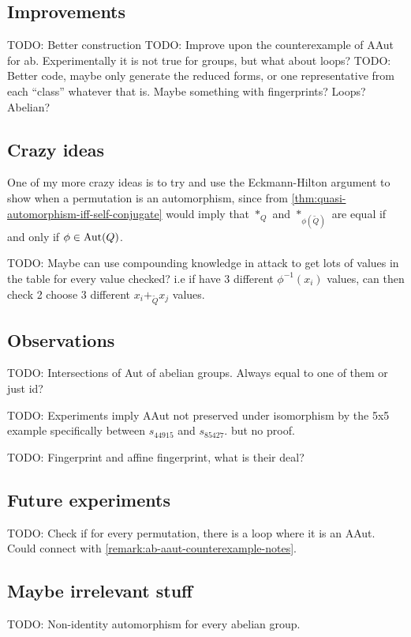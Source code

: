 \subsection{Improvements}

TODO: Better construction 
TODO: Improve upon the counterexample of AAut for ab. Experimentally it is not true for groups, but what about loops?
TODO: Better code, maybe only generate the reduced forms, or one representative from each ``class'' whatever that is. Maybe something with fingerprints? Loops? Abelian?

\subsection{Crazy ideas}

\begin{idea}
    One of my more crazy ideas is to try and use the Eckmann-Hilton argument to show when a permutation is an automorphism, since from \autoref{thm:quasi-automorphism-iff-self-conjugate} would imply that \( *_Q \) and \( *_{\phi(\tilde{Q})} \) are equal if and only if \( \phi \in \operatorname{Aut}(Q) \).
\end{idea}

\begin{idea}
    TODO: Maybe can use compounding knowledge in attack to get lots of values in the table for every value checked? i.e if have 3 different \( \phi^{-1}(x_i) \) values, can then check 2 choose 3 different \( x_i +_{\tilde{Q}} x_j  \) values.
\end{idea}

\subsection{Observations}

TODO: Intersections of Aut of abelian groups. Always equal to one of them or just id?

TODO: Experiments imply AAut not preserved under isomorphism by the 5x5 example specifically between \( s_{44915} \) and \( s_{85427} \). but no proof.

TODO: Fingerprint and affine fingerprint, what is their deal?

\subsection{Future experiments}

TODO: Check if for every permutation, there is a loop where it is an AAut. Could connect with \autoref{remark:ab-aaut-counterexample-notes}.

\subsection{Maybe irrelevant stuff}

TODO: Non-identity automorphism for every abelian group.